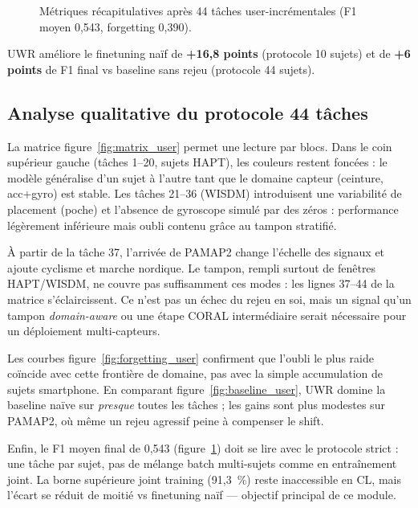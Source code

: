 \begin{figure}[H]
  \centering
  \caption[Métriques récapitulatives user-incrémental]{Métriques récapitulatives après
  44 tâches user-incrémentales (F1 moyen 0,543, forgetting 0,390).}
  \label{fig:summary_user}
\end{figure}

UWR améliore le finetuning naïf de \textbf{+16,8 points} (protocole 10 sujets) et
de \textbf{+6 points} de F1 final vs baseline sans rejeu (protocole 44 sujets).

\subsection{Analyse qualitative du protocole 44 tâches}

La matrice figure~\ref{fig:matrix_user} permet une lecture par blocs. Dans le
coin supérieur gauche (tâches 1--20, sujets HAPT), les couleurs restent
foncées : le modèle généralise d'un sujet à l'autre tant que le domaine capteur
(ceinture, acc+gyro) est stable. Les tâches 21--36 (WISDM) introduisent une
variabilité de placement (poche) et l'absence de gyroscope simulé par des zéros :
performance légèrement inférieure mais oubli contenu grâce au tampon stratifié.

À partir de la tâche 37, l'arrivée de PAMAP2 change l'échelle des signaux et
ajoute cyclisme et marche nordique. Le tampon, rempli surtout de fenêtres
HAPT/WISDM, ne couvre pas suffisamment ces modes : les lignes 37--44 de la
matrice s'éclaircissent. Ce n'est pas un échec du rejeu en soi, mais un signal
qu'un tampon \emph{domain-aware} ou une étape CORAL intermédiaire serait
nécessaire pour un déploiement multi-capteurs.

Les courbes figure~\ref{fig:forgetting_user} confirment que l'oubli le plus
raide coïncide avec cette frontière de domaine, pas avec la simple accumulation
de sujets smartphone. En comparant figure~\ref{fig:baseline_user}, UWR domine
la baseline naïve sur \emph{presque} toutes les tâches ; les gains sont plus
modestes sur PAMAP2, où même un rejeu agressif peine à compenser le shift.

Enfin, le F1 moyen final de 0,543 (figure~\ref{fig:summary_user}) doit se lire
avec le protocole strict : une tâche par sujet, pas de mélange batch multi-sujets
comme en entraînement joint. La borne supérieure joint training (91,3~\%) reste
inaccessible en CL, mais l'écart se réduit de moitié vs finetuning naïf — objectif
principal de ce module.

